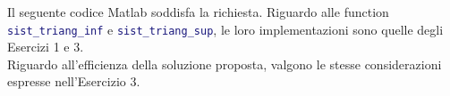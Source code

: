 \begin{center}
\footnotesize\noindent{}\end{center}

\noindent Il seguente codice Matlab soddisfa la richiesta. Riguardo alle function \lstinline[language=Matlab]{sist_triang_inf} e \lstinline[language=Matlab]{sist_triang_sup}, le loro implementazioni sono quelle degli Esercizi 1 e 3.
\\



\noindent Riguardo all'efficienza della soluzione proposta, valgono le stesse considerazioni espresse nell'Esercizio 3.
